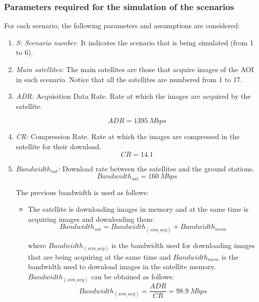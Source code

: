 \subsubsection{Parameters required for the simulation of the scenarios}
\label{subsubsec:parameters-required}
For each scenario, the following parameters and assumptions are considered:
\begin{enumerate}
\item \emph{S: Scenario number.} It indicates the scenario that is being simulated (from 1 to 6).
\item \emph{Main satellites:} The main satellites are those that acquire images of the AOI in each scenario. Notice that all the satellites are numbered from 1 to 17.
\item \emph{ADR:} Acquisition Data Rate. Rate at which the images are acquired
  by the satellite.

\begin{equation} \label{eq:ADR}
ADR=1395~Mbps
\end{equation}

\item \emph{CR:} Compression Rate. Rate at which the images are compressed in
  the satellite for their download.
\begin{equation}\label{eq:CR}
CR=14.1
\end{equation}
\item \emph{$Bandwidth_{sat}$:} Download rate between the satellites and the
  ground stations.
\begin{equation}\label{eq:Bandwidth}
Bandwidth_{sat}=160~Mbps
\end{equation}

The previous bandwidth is used as follows:
\begin{itemize}
\item The satellite is downloading images in memory and at the same time is
  acquiring images and downloading them:
\begin{equation}\label{eq:totalBandwidth}
Bandwidth_{sat}=Bandwidth_{(sim\_acq)}+Bandwidth_{mem}
\end{equation}

where $Bandwidth_{(sim\_acq)}$ is the bandwidth used for downloading images that
are being acquiring at the same time and $Bandwidth_{mem}$ is the bandwidth used
to download images in the satellite memory. $Bandwidth_{(sim\_acq)}$ can be
obtained as follows:
\begin{equation}\label{eq:bandwidth-sim}
  Bandwidth_{(sim\_acq)}=\frac{ADR}{CR}=98.9~Mbps
\end{equation}


\end{itemize}
\end{enumerate}
